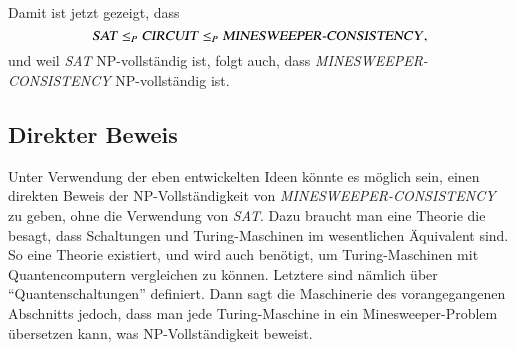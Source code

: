 Damit ist jetzt gezeigt, dass
\[
\text{\textsl{SAT}}\le_P
\text{\textsl{CIRCUIT}}\le_P\text{\textsl{MINESWEEPER-CONSISTENCY}},
\]
und weil \textsl{SAT} NP-vollständig ist, folgt auch, dass 
\textsl{MINESWEEPER-CONSISTENCY} NP-vollständig ist.

\subsection{Direkter Beweis}
Unter Verwendung der eben entwickelten Ideen könnte es möglich sein,
einen direkten Beweis der NP-Vollständigkeit von
\textsl{MINESWEEPER-CONSISTENCY} zu geben, ohne die Verwendung
von \textsl{SAT}. Dazu braucht man eine Theorie die besagt, dass
Schaltungen und Turing-Maschinen im wesentlichen Äquivalent sind.
So eine Theorie existiert, und wird auch benötigt, um Turing-Maschinen
mit Quantencomputern vergleichen zu können. Letztere sind nämlich
über ``Quantenschaltungen'' definiert. Dann sagt die Maschinerie des
vorangegangenen Abschnitts jedoch, dass man jede Turing-Maschine in
ein Minesweeper-Problem übersetzen kann, was NP-Vollständigkeit
beweist.
